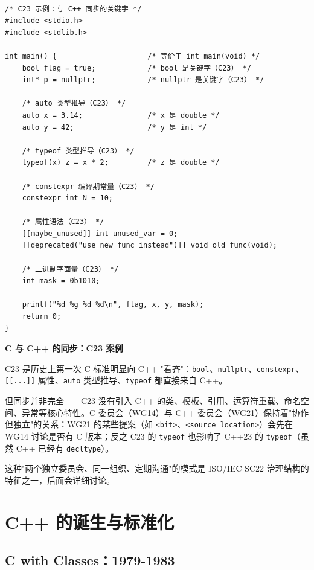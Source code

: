 \documentclass[12pt,a4paper,fontset=fandol]{ctexbook}
\newcommand{\clabel}{%
  \tcbox[on line,colback=cheadbg,colframe=cheadbg,
    boxrule=0pt,arc=1pt,left=2pt,right=2pt,top=1pt,bottom=1pt,
    colupper=white,fontupper=\scriptsize\bfseries]{C}}
\newcommand{\kw}[1]{\texttt{#1}}
\begin{document}
\clabel\ \begin{lstlisting}[style=cstyle]
/* C23 示例：与 C++ 同步的关键字 */
#include <stdio.h>
#include <stdlib.h>

int main() {                     /* 等价于 int main(void) */
    bool flag = true;            /* bool 是关键字（C23） */
    int* p = nullptr;            /* nullptr 是关键字（C23） */

    /* auto 类型推导（C23） */
    auto x = 3.14;               /* x 是 double */
    auto y = 42;                 /* y 是 int */

    /* typeof 类型推导（C23） */
    typeof(x) z = x * 2;         /* z 是 double */

    /* constexpr 编译期常量（C23） */
    constexpr int N = 10;

    /* 属性语法（C23） */
    [[maybe_unused]] int unused_var = 0;
    [[deprecated("use new_func instead")]] void old_func(void);

    /* 二进制字面量（C23） */
    int mask = 0b1010;

    printf("%d %g %d %d\n", flag, x, y, mask);
    return 0;
}
\end{lstlisting}

\begin{compare}
\textbf{C 与 C++ 的同步：C23 案例}

C23 是历史上第一次 C 标准明显向 C++ "看齐"：\kw{bool}、\kw{nullptr}、\kw{constexpr}、\kw{[[...]]} 属性、\kw{auto} 类型推导、\kw{typeof} 都直接来自 C++。

但同步并非完全——C23 没有引入 C++ 的类、模板、引用、运算符重载、命名空间、异常等核心特性。C 委员会（WG14）与 C++ 委员会（WG21）保持着"协作但独立"的关系：WG21 的某些提案（如 \kw{<bit>}、\kw{<source\_location>}）会先在 WG14 讨论是否有 C 版本；反之 C23 的 \kw{typeof} 也影响了 C++23 的 \kw{typeof}（虽然 C++ 已经有 \kw{decltype}）。

这种"两个独立委员会、同一组织、定期沟通"的模式是 ISO/IEC SC22 治理结构的特征之一，后面会详细讨论。
\end{compare}

\part{C++ 的诞生与标准化}

\chapter{C with Classes：1979-1983}
\end{document}
